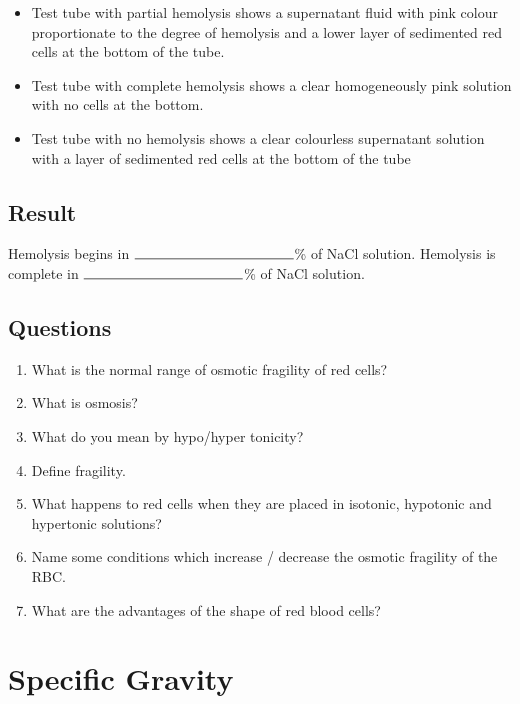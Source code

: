 \documentclass[a4paper,12pt,openany,oneside]{book}
\begin{document}
														\begin{itemize}
															\item{Test tube with partial hemolysis shows a supernatant fluid with pink colour proportionate to the degree of hemolysis and a lower layer of sedimented red cells at the bottom of the tube.}
															\item{Test tube with complete hemolysis shows a clear homogeneously pink solution with no cells at the bottom.}
															\item{Test tube with no hemolysis shows a clear colourless supernatant solution with a layer of sedimented red cells at the bottom of the tube}
														\end{itemize}
														\section*{Result}
														Hemolysis begins in $\rule{4cm}{.5pt}$\% of NaCl solution.\newline
														Hemolysis is complete in $\rule{4cm}{.5pt}$\% of NaCl solution.
														\section*{Questions}
														\begin{enumerate}
															\item{What is the normal range of osmotic fragility of red cells?}
															\item{What is osmosis?}
															\item{What do you mean by hypo/hyper tonicity?}
															\item{Define fragility.}
															\item{What happens to red cells when they are placed in isotonic, hypotonic and hypertonic solutions?}
															\item{Name some conditions which increase / decrease the osmotic fragility of the RBC.}
															\item{What are the advantages of the shape of red blood cells?}
														\end{enumerate}	


														\chapter*{\centering Specific Gravity}
\end{document}
